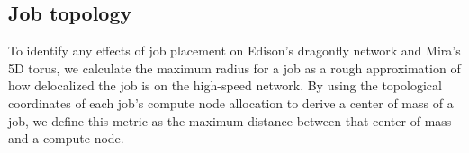\subsection{Job topology} \label{sec:methods/other}

To identify any effects of job placement on Edison's dragonfly network and Mira's 5D torus, we calculate the maximum radius for a job as a rough approximation of how delocalized the job is on the high-speed network.
By using the topological coordinates of each job's compute node allocation to derive a center of mass of a job, we define this metric as the maximum distance between that center of mass and a compute node.

